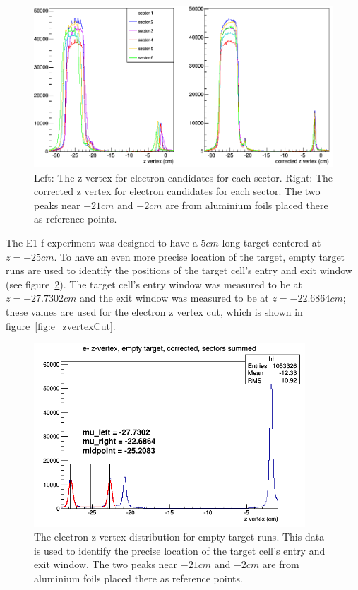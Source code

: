 \begin{figure}[htp]
\centering
\includegraphics[width=6in]{figures/corrVuncorrZvertex.png}
\caption{Left: The z vertex for electron candidates for each sector. Right: The corrected z vertex for electron candidates for each sector. The two peaks near $-21 cm$ and $-2 cm$ are from aluminium foils placed there as reference points.}
\label{fig:corrVuncorrZvertex}
\end{figure}
%
The E1-f experiment was designed to have a $5 cm$ long target centered at $z = -25 cm$.
To have an even more precise location of the target, empty target runs are used to identify the positions of the target cell's entry and exit window (see figure~\ref{fig:emptyTargZ_integ6}).
The target cell's entry window was measured to be at $z = -27.7302 cm$ and the exit window was measured to be at $z = -22.6864 cm$; these values are used for the electron z vertex cut, which is shown in figure~\ref{fig:e_zvertexCut}.
%
\begin{figure}[htp]
\centering
\includegraphics[width=4in]{figures/emptyTargZ_integ6.png}
\caption{The electron z vertex distribution for empty target runs. This data is used to identify the precise location of the target cell's entry and exit window. The two peaks near $-21 cm$ and $-2 cm$ are from aluminium foils placed there as reference points.}
\label{fig:emptyTargZ_integ6}
\end{figure}
